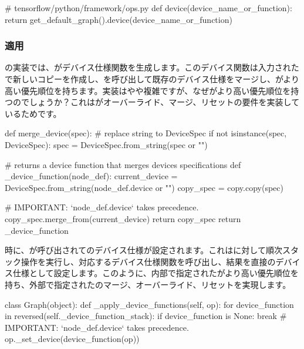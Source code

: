 \begin{content}
\begin{leftbar}
\begin{python}
# tensorflow/python/framework/ops.py
def device(device_name_or_function):
  return get_default_graph().device(device_name_or_function)
\end{python}
\end{leftbar}

\subsubsection{適用}

の実装では、がデバイス仕様関数を生成します。このデバイス関数は入力されたで新しいコピーを作成し、を呼び出して既存のデバイス仕様をマージし、がより高い優先順位を持ちます。実装はやや複雑ですが、なぜがより高い優先順位を持つのでしょうか？これはがオーバーライド、マージ、リセットの要件を実装しているためです。

\begin{leftbar}
\begin{python}
def merge_device(spec):
  # replace string to DeviceSpec
  if not isinstance(spec, DeviceSpec):
    spec = DeviceSpec.from_string(spec or "")

  # returns a device function that merges devices specifications
  def _device_function(node_def):
    current_device = DeviceSpec.from_string(node_def.device or "")
    copy_spec = copy.copy(spec)

    # IMPORTANT: `node\_def.device` takes precedence.
    copy_spec.merge_from(current_device)      
    return copy_spec
  return _device_function
\end{python}
\end{leftbar}

時に、が呼び出されてのデバイス仕様が設定されます。これはに対して順次スタック操作を実行し、対応するデバイス仕様関数を呼び出し、結果を直接のデバイス仕様として設定します。このように、内部で指定されたがより高い優先順位を持ち、外部で指定されたのマージ、オーバーライド、リセットを実現します。

\begin{leftbar}
\begin{python}
class Graph(object):
  def _apply_device_functions(self, op):
    for device_function in reversed(self._device_function_stack):
      if device_function is None:
        break
      # IMPORTANT: `node\_def.device` takes precedence. 
      op._set_device(device_function(op))
\end{python}
\end{leftbar}

\end{content}
